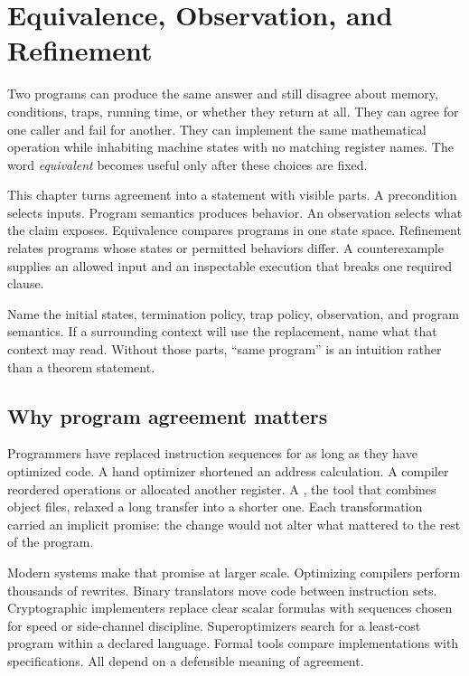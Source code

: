 \chapter{Equivalence, Observation, and Refinement}
\label{ch:equivalence-refinement}

Two programs can produce the same answer and still disagree about memory,
conditions, traps, running time, or whether they return at all. They can agree
for one caller and fail for another. They can implement the same mathematical
operation while inhabiting machine states with no matching register names.
The word \emph{equivalent} becomes useful only after these choices are fixed.

This chapter turns agreement into a statement with visible parts. A
precondition selects inputs. Program semantics produces behavior. An
observation selects what the claim exposes. Equivalence compares programs in
one state space. Refinement relates programs whose states or permitted
behaviors differ. A counterexample supplies an allowed input and an inspectable
execution that breaks one required clause.

\begin{keyidea}[title={Equivalence is always relative to a contract}]
Name the initial states, termination policy, trap policy, observation, and
program semantics. If a surrounding context will use the replacement, name
what that context may read. Without those parts, ``same program'' is an
intuition rather than a theorem statement.
\end{keyidea}

\section{Why program agreement matters}

Programmers have replaced instruction sequences for as long as they have
optimized code. A hand optimizer shortened an address calculation. A compiler
reordered operations or allocated another register. A , the
tool that combines object files, relaxed a long
transfer into a shorter one. Each transformation carried an implicit promise:
the change would not alter what mattered to the rest of the program.

Modern systems make that promise at larger scale. Optimizing compilers perform
thousands of rewrites. Binary translators move code between instruction sets.
Cryptographic implementers replace clear scalar formulas with sequences chosen
for speed or side-channel discipline. Superoptimizers search for a least-cost
program within a declared language. Formal tools compare implementations with
specifications. All depend on a defensible meaning of agreement.

